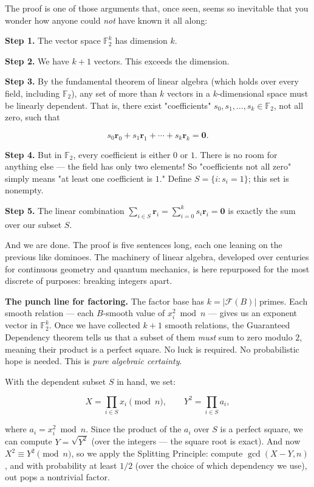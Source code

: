 \documentclass[12pt, letterpaper, openany]{book}
\theoremstyle{definition}
\theoremstyle{remark}
\begin{document}
The proof is one of those arguments that, once seen, seems so inevitable that you wonder how anyone could \textit{not} have known it all along:

\textbf{Step 1.} The vector space $\mathbb{F}_2^k$ has dimension $k$.

\textbf{Step 2.} We have $k + 1$ vectors. This exceeds the dimension.

\textbf{Step 3.} By the fundamental theorem of linear algebra (which holds over every field, including $\mathbb{F}_2$), any set of more than $k$ vectors in a $k$-dimensional space must be linearly dependent. That is, there exist "coefficients" $s_0, s_1, \ldots, s_k \in \mathbb{F}_2$, not all zero, such that

\[
s_0 \mathbf{r}_0 + s_1 \mathbf{r}_1 + \cdots + s_k \mathbf{r}_k = \mathbf{0}.
\]

\textbf{Step 4.} But in $\mathbb{F}_2$, every coefficient is either $0$ or $1$. There is no room for anything else --- the field has only two elements! So "coefficients not all zero" simply means "at least one coefficient is $1$." Define $S = \{i : s_i = 1\}$; this set is nonempty.

\textbf{Step 5.} The linear combination $\sum_{i \in S} \mathbf{r}_i = \sum_{i=0}^k s_i \mathbf{r}_i = \mathbf{0}$ is exactly the sum over our subset $S$.

And we are done. The proof is five sentences long, each one leaning on the previous like dominoes. The machinery of linear algebra, developed over centuries for continuous geometry and quantum mechanics, is here repurposed for the most discrete of purposes: breaking integers apart.

\textbf{The punch line for factoring.} The factor base has $k = |\mathcal{F}(B)|$ primes. Each smooth relation --- each $B$-smooth value of $x_i^2 \bmod n$ --- gives us an exponent vector in $\mathbb{F}_2^k$. Once we have collected $k + 1$ smooth relations, the Guaranteed Dependency theorem tells us that a subset of them \textit{must} sum to zero modulo $2$, meaning their product is a perfect square. No luck is required. No probabilistic hope is needed. This is \textit{pure algebraic certainty}.

With the dependent subset $S$ in hand, we set:

\[
X = \prod_{i \in S} x_i \pmod{n}, \qquad Y^2 = \prod_{i \in S} a_i,
\]

where $a_i = x_i^2 \bmod n$. Since the product of the $a_i$ over $S$ is a perfect square, we can compute $Y = \sqrt{Y^2}$ (over the integers --- the square root is exact). And now $X^2 \equiv Y^2 \pmod{n}$, so we apply the Splitting Principle: compute $\gcd(X - Y, n)$, and with probability at least $1/2$ (over the choice of which dependency we use), out pops a nontrivial factor.
\end{document}
